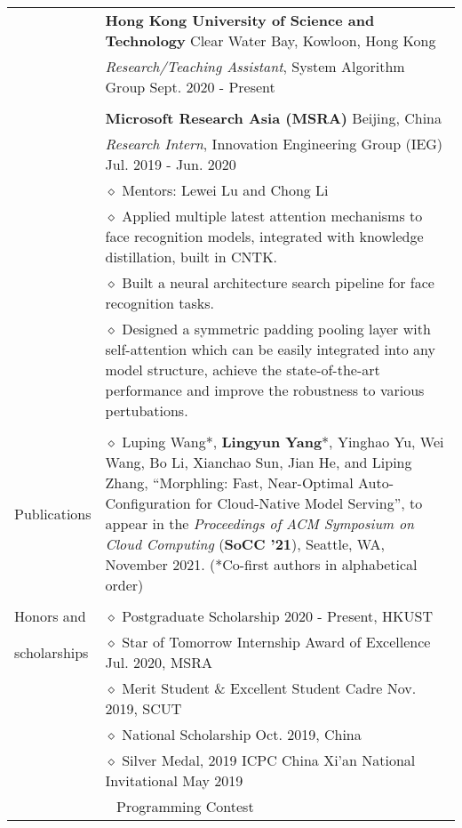 \documentclass[letterpaper, 11pt]{article}
\begin{document}
\begin{longtable}{p{1in}p{5in}}
& {\textbf{Hong Kong University of Science and Technology}} \hfill Clear Water Bay, Kowloon, Hong Kong \\
& \textit{Research/Teaching Assistant}, System Algorithm Group \hfill Sept. 2020 - Present \\
& \\
 
& {\textbf{Microsoft Research Asia (MSRA)}} \hfill Beijing, China\\
& \textit{Research Intern}, Innovation Engineering Group (IEG) \hfill Jul. 2019 - Jun. 2020 \\
& $\diamond$ Mentors: Lewei Lu and Chong Li \\
& $\diamond$ Applied multiple latest attention mechanisms to face recognition models, integrated with knowledge distillation, built in CNTK. \\
& $\diamond$ Built a neural architecture search pipeline for face recognition tasks. \\
& $\diamond$ Designed a symmetric padding pooling layer with self-attention which can be easily integrated into any model structure, achieve the state-of-the-art performance and improve the robustness to various pertubations. \\
& \\

\nohyphens{Publications}
& $\diamond$ Luping Wang*, \textbf{Lingyun Yang}*, Yinghao Yu, Wei Wang, Bo Li, Xianchao Sun, Jian He, and Liping Zhang, “Morphling: Fast, Near-Optimal Auto-Configuration for Cloud-Native Model Serving”, to appear in the \textit{Proceedings of ACM Symposium on Cloud Computing} (\textbf{SoCC ’21}), Seattle, WA, November 2021. (*Co-first authors in alphabetical order) \\
& \\

{Honors and }
& $\diamond$ Postgraduate Scholarship \hfill 2020 - Present, HKUST \\
{scholarships}
& $\diamond$ Star of Tomorrow Internship Award of Excellence \hfill Jul. 2020, MSRA \\

& $\diamond$ Merit Student \& Excellent Student Cadre \hfill Nov. 2019, SCUT \\
& $\diamond$ National Scholarship \hfill Oct. 2019, China \\

& $\diamond$ Silver Medal, 2019 ICPC China Xi'an National Invitational \hfill May 2019 \\
& $\ \ $ Programming Contest \\


\end{longtable}
\end{document}
